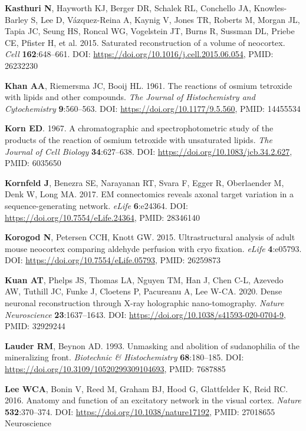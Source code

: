 \documentclass{article}
\newenvironment{reflist}{\par\small\setlength{\parindent}{0pt}\everypar{\hangindent=2.2em\hangafter=1}}{\par}
\begin{document}
\begin{reflist}
\textbf{Kasthuri N}, Hayworth KJ, Berger DR, Schalek RL, Conchello JA, Knowles-Barley S, Lee D, Vázquez-Reina A, Kaynig V, Jones TR, Roberts M, Morgan JL, Tapia JC, Seung HS, Roncal WG, Vogelstein JT, Burns R, Sussman DL, Priebe CE, Pfister H, et al. 2015. Saturated reconstruction of a volume of neocortex. \emph{Cell} \textbf{162}:648–661. DOI: \url{https://doi.org/10.1016/j.cell.2015.06.054}, PMID: 26232230

\textbf{Khan AA}, Riemersma JC, Booij HL. 1961. The reactions of osmium tetroxide with lipids and other compounds. \emph{The Journal of Histochemistry and Cytochemistry} \textbf{9}:560–563. DOI: \url{https://doi.org/10.1177/9.5.560}, PMID: 14455534

\textbf{Korn ED}. 1967. A chromatographic and spectrophotometric study of the products of the reaction of osmium tetroxide with unsaturated lipids. \emph{The Journal of Cell Biology} \textbf{34}:627–638. DOI: \url{https://doi.org/10.1083/jcb.34.2.627}, PMID: 6035650

\textbf{Kornfeld J}, Benezra SE, Narayanan RT, Svara F, Egger R, Oberlaender M, Denk W, Long MA. 2017. EM connectomics reveals axonal target variation in a sequence-generating network. \emph{eLife} \textbf{6}:e24364. DOI: \url{https://doi.org/10.7554/eLife.24364}, PMID: 28346140

\textbf{Korogod N}, Petersen CCH, Knott GW. 2015. Ultrastructural analysis of adult mouse neocortex comparing aldehyde perfusion with cryo fixation. \emph{eLife} \textbf{4}:e05793. DOI: \url{https://doi.org/10.7554/eLife.05793}, PMID: 26259873

\textbf{Kuan AT}, Phelps JS, Thomas LA, Nguyen TM, Han J, Chen C-L, Azevedo AW, Tuthill JC, Funke J, Cloetens P, Pacureanu A, Lee W-CA. 2020. Dense neuronal reconstruction through X-ray holographic nano-tomography. \emph{Nature Neuroscience} \textbf{23}:1637–1643. DOI: \url{https://doi.org/10.1038/s41593-020-0704-9}, PMID: 32929244

\textbf{Lauder RM}, Beynon AD. 1993. Unmasking and abolition of sudanophilia of the mineralizing front. \emph{Biotechnic \& Histochemistry} \textbf{68}:180–185. DOI: \url{https://doi.org/10.3109/10520299309104693}, PMID: 7687885

\textbf{Lee WCA}, Bonin V, Reed M, Graham BJ, Hood G, Glattfelder K, Reid RC. 2016. Anatomy and function of an excitatory network in the visual cortex. \emph{Nature} \textbf{532}:370–374. DOI: \url{https://doi.org/10.1038/nature17192}, PMID: 27018655 Neuroscience


\end{reflist}
\end{document}
